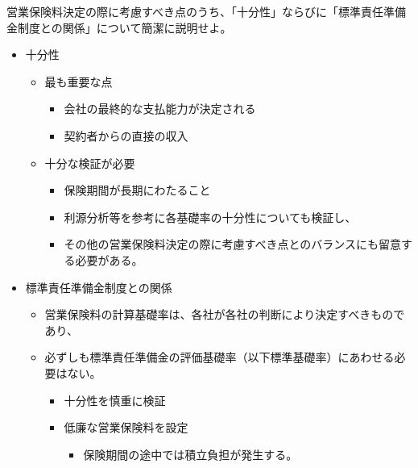 \documentclass[report,gutter=10mm,fore-edge=10mm,uplatex,dvipdfmx]{jlreq}
\begin{document}

営業保険料決定の際に考慮すべき点のうち、「十分性」ならびに「標準責任準備金制度との関係」について簡潔に説明せよ。


\begin{itemize}
\tightlist
\item
  十分性

  \begin{itemize}
  \tightlist
  \item
    最も重要な点

    \begin{itemize}
    \tightlist
    \item
      会社の最終的な支払能力が決定される
    \item
      契約者からの直接の収入
    \end{itemize}
  \item
    十分な検証が必要

    \begin{itemize}
    \tightlist
    \item
      保険期間が長期にわたること
    \item
      利源分析等を参考に各基礎率の十分性についても検証し、
    
      \item
      その他の営業保険料決定の際に考慮すべき点とのバランスにも留意する必要がある。
    \end{itemize}
  \end{itemize}
\item
  標準責任準備金制度との関係

  \begin{itemize}
  \tightlist
  \item
    営業保険料の計算基礎率は、各社が各社の判断により決定すべきものであり、

  \item
      必ずしも標準責任準備金の評価基礎率（以下標準基礎率）にあわせる必要はない。

      \begin{itemize}
      \tightlist
      \item
        十分性を慎重に検証
      \item
        低廉な営業保険料を設定

        \begin{itemize}
        \tightlist
        \item
          保険期間の途中では積立負担が発生する。


\end{itemize}
\end{itemize}
\end{itemize}
\end{itemize}
\end{document}

